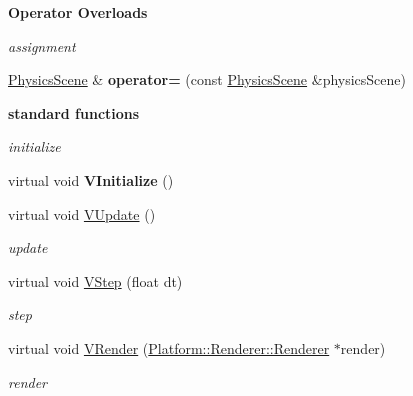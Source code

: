 \begin{Indent}{\bf Operator Overloads}\par
{\em \label{_amgrpffbf53248b2217a5cbc374d28018eed5}
 assignment }\begin{DoxyCompactItemize}
\item 
\hypertarget{classContent_1_1Physics_1_1PhysicsScene_aebc7279d8bcb41071c545a22c955ffad}{
\hyperlink{classContent_1_1Physics_1_1PhysicsScene}{PhysicsScene} \& {\bfseries operator=} (const \hyperlink{classContent_1_1Physics_1_1PhysicsScene}{PhysicsScene} \&physicsScene)}
\label{classContent_1_1Physics_1_1PhysicsScene_aebc7279d8bcb41071c545a22c955ffad}

\end{DoxyCompactItemize}
\end{Indent}
\begin{Indent}{\bf standard functions}\par
{\em \label{_amgrp57f1c50bd31a278c7d9f58b3e669c84c}
 initialize }\begin{DoxyCompactItemize}
\item 
\hypertarget{classContent_1_1Physics_1_1PhysicsScene_a46c926fef09313f7a05ed54a0117c293}{
virtual void {\bfseries VInitialize} ()}
\label{classContent_1_1Physics_1_1PhysicsScene_a46c926fef09313f7a05ed54a0117c293}

\item 
\hypertarget{classContent_1_1Physics_1_1PhysicsScene_a54e0492075a67cfdfdd735957208ec51}{
virtual void \hyperlink{classContent_1_1Physics_1_1PhysicsScene_a54e0492075a67cfdfdd735957208ec51}{VUpdate} ()}
\label{classContent_1_1Physics_1_1PhysicsScene_a54e0492075a67cfdfdd735957208ec51}

\begin{DoxyCompactList}\small\item\em update \item\end{DoxyCompactList}\item 
\hypertarget{classContent_1_1Physics_1_1PhysicsScene_a373c71cc4a853231322b32435b324b31}{
virtual void \hyperlink{classContent_1_1Physics_1_1PhysicsScene_a373c71cc4a853231322b32435b324b31}{VStep} (float dt)}
\label{classContent_1_1Physics_1_1PhysicsScene_a373c71cc4a853231322b32435b324b31}

\begin{DoxyCompactList}\small\item\em step \item\end{DoxyCompactList}\item 
\hypertarget{classContent_1_1Physics_1_1PhysicsScene_a6a9166aa1b1de550688967710ec698c7}{
virtual void \hyperlink{classContent_1_1Physics_1_1PhysicsScene_a6a9166aa1b1de550688967710ec698c7}{VRender} (\hyperlink{classPlatform_1_1Renderer_1_1Renderer}{Platform::Renderer::Renderer} $\ast$render)}
\label{classContent_1_1Physics_1_1PhysicsScene_a6a9166aa1b1de550688967710ec698c7}

\begin{DoxyCompactList}\small\item\em render \item\end{DoxyCompactList}\end{DoxyCompactItemize}
\end{Indent}
